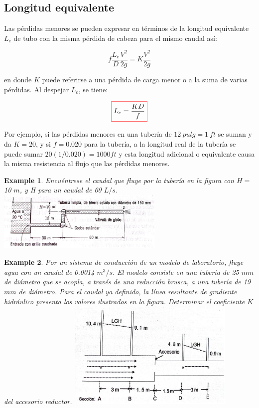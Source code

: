\documentclass[11pt, oneside]{article}
\newtheorem{exa}{Example}
\begin{document}
\subsection{Longitud equivalente} %
Las p\'erdidas menores se pueden expresar en t\'erminos de la longitud equivalente $L_e$ de tubo con la misma p\'erdida de cabeza para el mismo caudal as\'i:

\begin{equation}
f \frac{L_e }{D} \frac{V^2}{2g} = K \frac{V^2}{2g}
\label{perm11}
\end{equation}

en donde $K$ puede referirse a una p\'erdida de carga menor o a la suma de varias p\'erdidas. Al despejar $L_e$, se tiene:

\begin{equation}
\color{red}\boxed{\color{black} L_e = \frac{KD}{f} }
\label{perm12}
\end{equation}

Por ejemplo, si las p\'erdidas menores en una tuber\'ia de $12\ pulg = 1\ ft$ se suman y da $K=20$, y si $f = 0.020$ para la tuber\'ia, a la longitud real de la tuber\'ia se puede sumar $20(1/0.020)=1000 ft$ y esta longitud adicional o equivalente causa la misma resistencia al flujo que las p\'erdidas menores. 

\begin{shaded}
\begin{exa}
Encu\'entrese el caudal que fluye por la tuber\'ia en la figura con $H =$ 10 $m$, y H para un caudal de 60 $L/s$.
\includegraphics[width=8cm]{exa20.jpeg}
\end{exa}
\end{shaded}


\begin{shaded}
\begin{exa}
Por un sistema de conducci\'on de un modelo de laboratorio, fluye agua con un caudal de 0.0014 $m^3/s$. El modelo consiste en una tuber\'ia de 25 $mm$ de di\'ametro que se acopla, a trav\'es de una reducci\'on brusca, a una tuber\'ia de 19 $mm$ de di\'ametro. Para el caudal ya definido, la l\'inea resultante de gradiente hidr\'aulico presenta los valores ilustrados en la figura. Determinar el coeficiente $K$ del accesorio reductor.
\includegraphics[width=8cm]{exa30.jpeg}
\end{exa}
\end{shaded}
\end{document}
